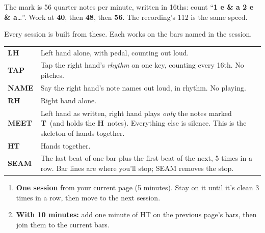 \documentclass[10pt]{article}
\newcommand{\sect}[1]{\par\vspace{5pt}{\large\bfseries #1}\par\vspace{2pt}}
\newcommand{\T}{\textbf{T}}\newcommand{\Lx}{\textbf{L}}\newcommand{\Hx}{\textbf{H}}
\begin{document}
\begin{minipage}[t]{0.485\textwidth}
\sect{Tempo}
The mark is 56 quarter notes per minute, written in 16ths: count ``\textbf{1 e \& a 2 e \& a}\dots''. Work at \textbf{40}, then \textbf{48}, then \textbf{56}. The recording's 112 is the same speed.
\end{minipage}\hfill
\begin{minipage}[t]{0.485\textwidth}
\sect{The seven moves}
Every session is built from these. Each works on the bars named in the session.\par\vspace{3pt}
\small
\renewcommand{\arraystretch}{1.3}
\begin{tabularx}{\linewidth}{@{}>{\bfseries}l X@{}}
\toprule
LH & Left hand alone, with pedal, counting out loud.\\
TAP & Tap the right hand's \emph{rhythm} on one key, counting every 16th. No pitches.\\
NAME & Say the right hand's note names out loud, in rhythm. No playing.\\
RH & Right hand alone.\\
MEET & Left hand as written, right hand plays \emph{only} the notes marked \T\ (and holds the \Hx\ notes). Everything else is silence. This is the skeleton of hands together.\\
HT & Hands together.\\
SEAM & The last beat of one bar plus the first beat of the next, 5 times in a row. Bar lines are where you'll stop; SEAM removes the stop.\\
\bottomrule
\end{tabularx}\normalsize

\sect{Daily routine}
\begin{enumerate}
\item \textbf{One session} from your current page (5 minutes). Stay on it until it's clean 3 times in a row, then move to the next session.
\item \textbf{With 10 minutes:} add one minute of HT on the previous page's bars, then join them to the current bars.
\end{enumerate}


\end{minipage}
\end{document}
